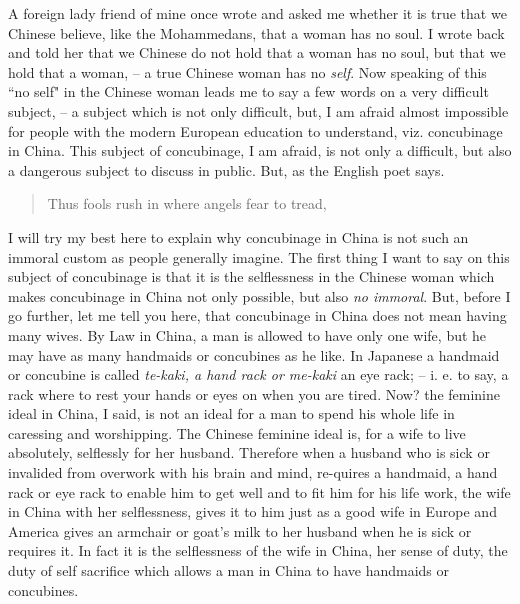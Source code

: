 A foreign lady friend of mine once wrote and asked me whether it is true that we Chinese believe,
like the Mohammedans, that a woman has no soul.
I wrote back and told her that we Chinese do not hold that a woman has no soul,
but that we hold that a woman,
-- a true Chinese woman has no \emph{self}.
Now speaking of this ``no self" in the Chinese woman leads me to say a few words on a very difficult subject,
-- a subject which is not only difficult,
but, I am afraid almost impossible for people with the modern European education to understand, viz. concubinage in China.
This subject of concubinage,
I am afraid, is not only a difficult, but also a dangerous subject to discuss in public.
But, as the English poet says.

\begin{quote}
Thus fools rush in where angels fear to tread,
\end{quote}

I will try my best here to explain why concubinage in China is not such an immoral custom as people generally imagine.
The first thing I want to say on this subject of concubinage is that it is the selflessness in the Chinese woman which makes concubinage in China not only possible,
but also \emph{no immoral}. But, before I go further,
let me tell you here, that concubinage in China does not mean having many wives.
By Law in China, a man is allowed to have only one wife,
but he may have as many handmaids or concubines as he like.
In Japanese a handmaid or concubine is called \emph{te-kaki, a hand rack or me-kaki} an eye rack;
-- i. e. to say, a rack where to rest your hands or eyes on when you are tired.
Now? the feminine ideal in China, I said, is not an ideal for a man to spend his whole life in caressing and worshipping.
The Chinese feminine ideal is, for a wife to live absolutely,
selflessly for her husband.
Therefore when a husband who is sick or invalided from overwork with his brain and mind,
re-quires a handmaid, a hand rack or eye rack to enable him to get well and to fit him for his life work,
the wife in China with her selflessness,
gives it to him just as a good wife in Europe and America gives an armchair or goat's milk to her husband when he is sick or requires it.
In fact it is the selflessness of the wife in China, her sense of duty,
the duty of self sacrifice which allows a man in China to have handmaids or concubines.

